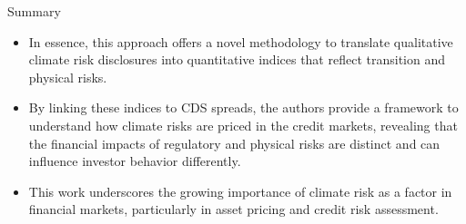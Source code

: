\documentclass[11pt]{beamer}
\begin{document}
\begin{frame}{Summary}
	\begin{itemize}
		\item In essence, this approach offers a novel methodology to translate qualitative climate risk disclosures into quantitative indices that reflect transition and physical risks. 

		\item By linking these indices to CDS spreads, the authors provide a framework to understand how climate risks are priced in the credit markets, revealing that the financial impacts of regulatory and physical risks are distinct and can influence investor behavior differently. 

		\item This work underscores the growing importance of climate risk as a factor in financial markets, particularly in asset pricing and credit risk assessment.
	\end{itemize}
\end{frame}
\end{document}
